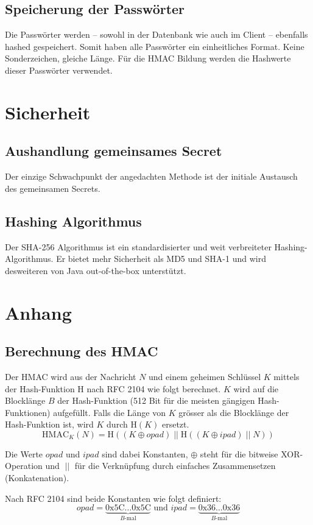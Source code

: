 \documentclass[10pt,a4paper]{scrartcl}
\begin{document}
\subsection{Speicherung der Passwörter}
Die Passwörter werden -- sowohl in der Datenbank wie auch im Client -- ebenfalls hashed
gespeichert. Somit haben alle Passwörter ein einheitliches Format. Keine Sonderzeichen, gleiche
Länge. Für die HMAC Bildung werden die Hashwerte dieser Passwörter verwendet.


\section{Sicherheit}

\subsection{Aushandlung gemeinsames Secret}
Der einzige Schwachpunkt der angedachten Methode ist der initiale Austausch des gemeinsamen Secrets.

\subsection{Hashing Algorithmus}
Der SHA-256 Algorithmus ist ein standardisierter und weit verbreiteter Hashing-Algorithmus. Er
bietet mehr Sicherheit als MD5 und SHA-1 und wird desweiteren von Java out-of-the-box unterstützt.


\newpage\section{Anhang}

\subsection{\label{hmac-calc}Berechnung des HMAC}

Der HMAC wird aus der Nachricht $N$ und einem geheimen Schlüssel $K$ mittels der Hash-Funktion
$\mathrm{H}$ nach RFC 2104 wie folgt berechnet. $K$ wird auf die Blocklänge $B$ der Hash-Funktion (512
Bit für die meisten gängigen Hash-Funktionen) aufgefüllt. Falls die Länge von $K$ grösser als die
Blocklänge der Hash-Funktion ist, wird $K$ durch $\mathrm{H}(K)$ ersetzt.
$$\mathrm{HMAC}_K(N) = \mathrm{H}\left(\left(K \oplus opad \right) \;||\; \mathrm{H}\left(\left(K
\oplus ipad \right) \;||\; N\right)\right)$$

Die Werte $opad$ und $ipad$ sind dabei Konstanten, $\oplus$ steht
für die bitweise XOR-Operation und $\;||\;$ für die Verknüpfung durch einfaches
Zusammensetzen (Konkatenation).

Nach RFC 2104 sind beide Konstanten wie folgt definiert:
$$opad = \underbrace{\mathrm{0x5C}\dots \mathrm{0x5C}}_{B\textrm{-mal}} \textrm{ und } ipad =
\underbrace{\mathrm{0x36}\dots \mathrm{0x36}}_{B\textrm{-mal}}$$
\end{document}
